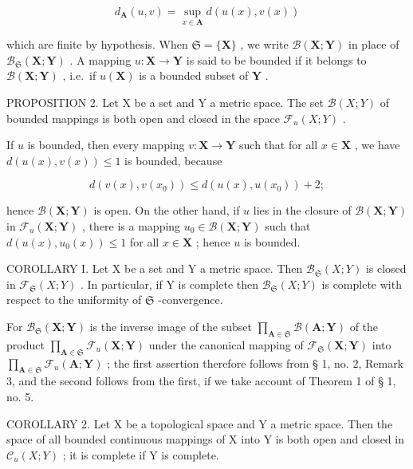 \[
d _ {\mathbf {A}} (u, v) = \sup _ {x \in \mathbf {A}} d (u (x), v (x))\tag{A ∈ S}
\]

which are finite by hypothesis. When \(\mathfrak{S} = \{\mathbf{X}\}\) , we write \(\mathcal{B}(\mathbf{X};\mathbf{Y})\) in place of \(\mathcal{B}_{\mathfrak{S}}(\mathbf{X};\mathbf{Y})\) . A mapping \(u:\mathbf{X}\to \mathbf{Y}\) is said to be bounded if it belongs to \(\mathcal{B}(\mathbf{X};\mathbf{Y})\) , i.e.~if \(u(\mathbf{X})\) is a bounded subset of \(\mathbf{Y}\) .

PROPOSITION 2. Let X be a set and Y a metric space. The set \(\mathcal{B}(X;Y)\) of bounded mappings is both open and closed in the space \(\mathcal{F}_{u}(X;Y)\) .

If \(u\) is bounded, then every mapping \(v: \mathbf{X} \to \mathbf{Y}\) such that for all \(x \in \mathbf{X}\) , we have \(d(u(x), v(x)) \leqslant 1\) is bounded, because

\[
d (v (x), v (x _ {0})) \leqslant d (u (x), u (x _ {0})) + 2;
\]

hence \(\mathcal{B}(\mathbf{X};\mathbf{Y})\) is open. On the other hand, if \(u\) lies in the closure of \(\mathcal{B}(\mathbf{X};\mathbf{Y})\) in \(\mathcal{F}_u(\mathbf{X};\mathbf{Y})\) , there is a mapping \(u_0\in \mathcal{B}(\mathbf{X};\mathbf{Y})\) such that \(d(u(x),u_0(x))\leqslant 1\) for all \(x\in \mathbf{X}\) ; hence \(u\) is bounded.

COROLLARY I. Let X be a set and Y a metric space. Then \(\mathcal{B}_{\mathfrak{S}}(X;Y)\) is closed in \(\mathcal{F}_{\mathfrak{S}}(X;Y)\) . In particular, if Y is complete then \(\mathcal{B}_{\mathfrak{S}}(X;Y)\) is complete with respect to the uniformity of \(\mathfrak{S}\) -convergence.

For \(\mathcal{B}_{\mathfrak{S}}(\mathbf{X};\mathbf{Y})\) is the inverse image of the subset \(\prod_{\mathbf{A}\in \mathfrak{S}}\mathcal{B}(\mathbf{A};\mathbf{Y})\) of the product \(\prod_{\mathbf{A}\in \mathfrak{S}}\mathcal{F}_u(\mathbf{X};\mathbf{Y})\) under the canonical mapping of \(\mathcal{F}_{\mathfrak{S}}(\mathbf{X};\mathbf{Y})\) into \(\prod_{\mathbf{A}\in \mathfrak{S}}\mathcal{F}_u(\mathbf{A};\mathbf{Y})\) ; the first assertion therefore follows from § 1, no. 2, Remark 3, and the second follows from the first, if we take account of Theorem 1 of § 1, no. 5.

COROLLARY 2. Let X be a topological space and Y a metric space. Then the space of all bounded continuous mappings of X into Y is both open and closed in \(\mathcal{C}_u(X;Y)\) ; it is complete if Y is complete.


